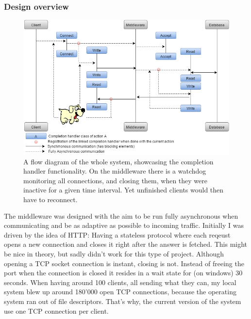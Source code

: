 \documentclass[11pt]{article}
\begin{document}
\subsubsection{Design overview}\label{sec:design-overview}
\begin{figure}[!htb]
\centering
\includegraphics[width=1.0\linewidth]{figures/middleware/mw_design}
\caption{A flow diagram of the whole system, showcasing the completion handler functionality. On the middleware there is a watchdog monitoring all connections, and closing them, when they were inactive for a given time interval. Yet unfinished clients would then have to reconnect.}
\label{fig:mw_design}
\end{figure}
The middleware was designed with the aim to be run fully asynchronous when communicating and be as adaptive as possible to incoming traffic. Initially I was driven by the idea of HTTP: Having a stateless protocol where each reqeust opens a new connection and closes it right after the answer is fetched. This might be nice in theory, but sadly didn't work for this type of project. Although opening a TCP socket connection is instant, closing is not. Instead of freeing the port when the connection is closed it resides in a wait state for (on windows) 30 seconds. When having around 100 clients, all sending what they can, my local system blew up around 180'000 open TCP connections, because the operating system ran out of file descriptors. That's why, the current version of the system use one TCP connection per client.
\end{document}
